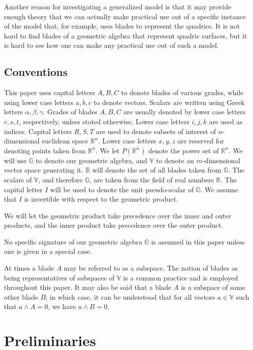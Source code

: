 \documentclass{birkjour}
\theoremstyle{definition}
\theoremstyle{remark}
\numberwithin{equation}{section}
\newcommand{\R}{\mathbb{R}}
\newcommand{\B}{\mathbb{B}}
\newcommand{\G}{\mathbb{G}}
\newcommand{\V}{\mathbb{V}}
\begin{document}
Another reason for investigating a generalized model is that it may provide enough theory that
we can actually make practical use out of a specific instance of the model that, for example,
uses blades to represent the quadrics.  It is not hard to find blades of a geometric algebra that
represent quadric surfaces, but it is hard to see how one can make any practical use out of such a model.

\subsection{Conventions}

This paper uses capital letters $A,B,C$ to denote blades of various grades,
while using lower case letters $a,b,c$ to denote vectors.  Scalars are written
using Greek letters $\alpha,\beta,\gamma$.  Grades of blades $A,B,C$ are usually
denoted by lower case letters $r,s,t$, respectively, unless stated otherwise.  Lower case letters $i,j,k$ are
used as indices.  Capital letters $R,S,T$
are used to denote subsets of interest of $n$-dimensional euclidean space $\R^n$.
Lower case letters $x,y,z$ are reserved for denoting points taken from $\R^n$.  We
let $P(\R^n)$ denote the power set of $\R^n$.
We will use $\G$ to denote our geometric algebra, and $\V$ to denote an $m$-dimensional vector
space generating it.  $\B$ will denote the set of all blades taken from $\G$.  The
scalars of $\V$, and therefore $\G$, are taken from the field of real numbers $\R$.
The capital letter $I$ will be used to denote the unit pseudo-scalar of $\G$.  We assume
that $I$ is invertible with respect to the geometric product.

We will let the geometric product take precedence over the inner and outer products,
and the inner product take precedence over the outer product.

No specific signature of our geometric algebra $\G$ is assumed in this paper unless
one is given in a special case.

At times a blade $A$ may be referred to as a subspace.  The notion of blades as being
representatives of subspaces of $\V$ is a common practice and is employed throughout this paper.
It may also be said that a blade $A$ is a subspace of some other blade $B$; in which case,
it can be understood that for all vectors $a\in\V$ such that $a\wedge A=0$, we have $a\wedge B=0$.

\section{Preliminaries}
\end{document}
